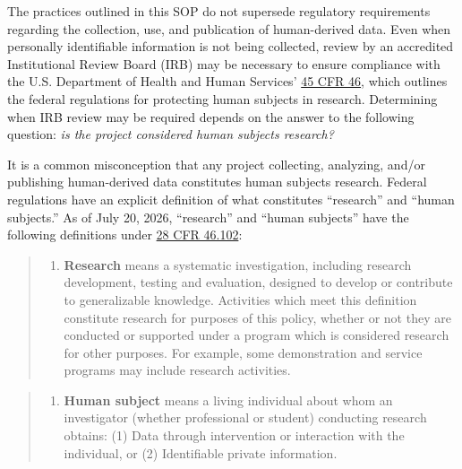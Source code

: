 \documentclass[
]{book}
\providecommand{\tightlist}{%
  \setlength{\itemsep}{0pt}\setlength{\parskip}{0pt}}
\begin{document}
The practices outlined in this SOP do not supersede regulatory requirements regarding the collection, use, and publication of human-derived data. Even when personally identifiable information is not being collected, review by an accredited Institutional Review Board (IRB) may be necessary to ensure compliance with the U.S. Department of Health and Human Services' \href{https://www.hhs.gov/ohrp/regulations-and-policy/regulations/45-cfr-46/index.html}{45 CFR 46}, which outlines the federal regulations for protecting human subjects in research. Determining when IRB review may be required depends on the answer to the following question: \emph{is the project considered human subjects research?}

It is a common misconception that any project collecting, analyzing, and/or publishing human-derived data constitutes human subjects research. Federal regulations have an explicit definition of what constitutes ``research'' and ``human subjects.'' As of July 20, 2026, ``research'' and ``human subjects'' have the following definitions under \href{https://www.ecfr.gov/current/title-28/chapter-I/part-46/section-46.102}{28 CFR 46.102}:

\begin{quote}
\begin{enumerate}
\def\labelenumi{(\alph{enumi})}
\setcounter{enumi}{3}
\tightlist
\item
  \textbf{Research} means a systematic investigation, including research development, testing and evaluation, designed to develop or contribute to generalizable knowledge. Activities which meet this definition constitute research for purposes of this policy, whether or not they are conducted or supported under a program which is considered research for other purposes. For example, some demonstration and service programs may include research activities.
\end{enumerate}
\end{quote}

\begin{quote}
\begin{enumerate}
\def\labelenumi{(\alph{enumi})}
\setcounter{enumi}{5}
\tightlist
\item
  \textbf{Human subject} means a living individual about whom an investigator (whether professional or student) conducting research obtains: (1) Data through intervention or interaction with the individual, or (2) Identifiable private information.
\end{enumerate}
\end{quote}
\end{document}
